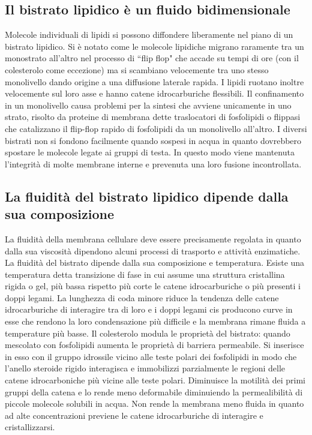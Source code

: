 \subsection{Il bistrato lipidico \`e un fluido bidimensionale}
Molecole individuali di lipidi si possono diffondere liberamente nel piano di un bistrato lipidico. Si \`e notato come le molecole lipidiche migrano 
raramente tra un monostrato all'altro nel processo di ``flip flop" che accade su tempi di ore (con il colesterolo come eccezione) ma si scambiano
velocemente tra uno stesso monolivello dando origine a una diffusione laterale rapida. I lipidi ruotano inoltre velocemente sul loro asse e hanno 
catene idrocarburiche flessibili. Il confinamento in un monolivello causa problemi per la sintesi che avviene unicamente in uno strato, risolto da
proteine di membrana dette traslocatori di fosfolipidi o flippasi che catalizzano il  flip-flop rapido di fosfolipidi da un monolivello all'altro. I 
diversi bistrati non si fondono facilmente quando sospesi in acqua in quanto dovrebbero spostare le molecole legate ai gruppi di testa. In questo modo
viene mantenuta l'integrit\`a di molte membrane interne e prevenuta una loro fusione incontrollata. 
\subsection{La fluidit\`a del bistrato lipidico dipende dalla sua composizione}
La fluidit\`a della membrana cellulare deve essere precisamente regolata in quanto dalla sua viscosit\`a dipendono alcuni processi di trasporto e attivit\`a enzimatiche. La fluidit\`a del
bistrato dipende dalla sua composizione e temperatura.  Esiste una temperatura detta transizione di fase in cui assume una struttura cristallina rigida o gel, pi\`u bassa rispetto pi\`u 
corte le catene idrocarburiche o pi\`u presenti i doppi legami. La lunghezza di coda minore riduce la tendenza delle catene idrocarburiche di interagire tra di loro e i doppi legami
cis producono curve in esse che rendono la loro condensazione pi\`u difficile e la membrana rimane fluida a temperature pi\`u basse. Il colesterolo modula le propriet\`a del bistrato:
quando mescolato con fosfolipidi aumenta le propriet\`a di barriera permeabile. Si inserisce in esso con il gruppo idrossile vicino alle teste polari dei fosfolipidi in 
modo che l'anello steroide rigido interagisca e immobilizzi parzialmente le regioni delle catene idrocarboniche pi\`u vicine alle teste polari. Diminuisce la motilit\`a dei primi gruppi
 della catena e lo rende meno deformabile diminuiendo la permealibilit\`a di piccole molecole solubili in acqua. Non rende la membrana meno fluida in quanto ad alte 
concentrazioni previene le catene idrocarburiche di interagire e cristallizzarsi. 
